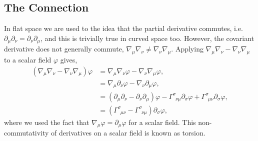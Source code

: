 \subsection{The Connection}\label{intro:sec:levicivita}

In flat space we are used to the idea that the partial derivative commutes, i.e. $\partial_\mu \partial_\nu = \partial_\nu \partial_\mu$, and this is trivially true in curved space too. However, the covariant derivative does not generally commute, $\nabla_\mu \nabla_\nu \neq \nabla_\nu \nabla_\mu$. Applying $\nabla_\mu \nabla_\nu - \nabla_\nu \nabla_\mu$ to a scalar field $\varphi$ gives,
\begin{align}
(\nabla_\mu \nabla_\nu  - \nabla_\nu \nabla_\mu )\varphi &= \nabla_\mu \nabla_\nu \varphi - \nabla_\nu \nabla_\mu \varphi , \\
                                               &= \nabla_\mu \partial_\nu \varphi - \nabla_\nu \partial_\mu \varphi , \\
                                               &= (\partial_\mu \partial_\nu  - \partial_\nu \partial_\mu )\varphi -  \Gamma^{\sigma}_{\,\,\,\nu\mu} \partial_\sigma \varphi + \Gamma^{\sigma}_{\,\,\,\mu\nu} \partial_\sigma \varphi,\\ 
                                               &=(\Gamma^{\sigma}_{\,\,\,\mu\nu}  - \Gamma^{\sigma}_{\,\,\,\nu\mu}) \partial_\sigma \varphi, 
\end{align}
where we used the fact that $\nabla_\mu \varphi = \partial_\mu \varphi$ for a scalar field. This non-commutativity of derivatives on a scalar field is known as torsion. 

